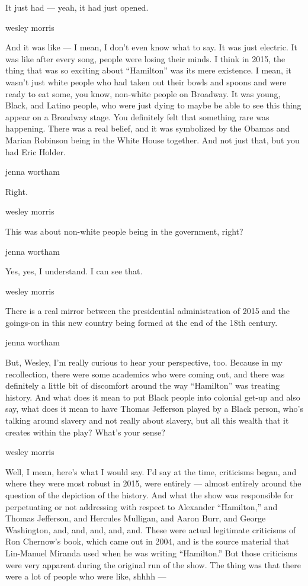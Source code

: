 It just had --- yeah, it had just opened.

wesley morris

And it was like --- I mean, I don't even know what to say. It was just
electric. It was like after every song, people were losing their minds.
I think in 2015, the thing that was so exciting about ``Hamilton'' was
its mere existence. I mean, it wasn't just white people who had taken
out their bowls and spoons and were ready to eat some, you know,
non-white people on Broadway. It was young, Black, and Latino people,
who were just dying to maybe be able to see this thing appear on a
Broadway stage. You definitely felt that something rare was happening.
There was a real belief, and it was symbolized by the Obamas and Marian
Robinson being in the White House together. And not just that, but you
had Eric Holder.

jenna wortham

Right.

wesley morris

This was about non-white people being in the government, right?

jenna wortham

Yes, yes, I understand. I can see that.

wesley morris

There is a real mirror between the presidential administration of 2015
and the goings-on in this new country being formed at the end of the
18th century.

jenna wortham

But, Wesley, I'm really curious to hear your perspective, too. Because
in my recollection, there were some academics who were coming out, and
there was definitely a little bit of discomfort around the way
``Hamilton'' was treating history. And what does it mean to put Black
people into colonial get-up and also say, what does it mean to have
Thomas Jefferson played by a Black person, who's talking around slavery
and not really about slavery, but all this wealth that it creates within
the play? What's your sense?

wesley morris

Well, I mean, here's what I would say. I'd say at the time, criticisms
began, and where they were most robust in 2015, were entirely --- almost
entirely around the question of the depiction of the history. And what
the show was responsible for perpetuating or not addressing with respect
to Alexander ``Hamilton,'' and Thomas Jefferson, and Hercules Mulligan,
and Aaron Burr, and George Washington, and, and, and, and, and. These
were actual legitimate criticisms of Ron Chernow's book, which came out
in 2004, and is the source material that Lin-Manuel Miranda used when he
was writing ``Hamilton.'' But those criticisms were very apparent during
the original run of the show. The thing was that there were a lot of
people who were like, shhhh ---

